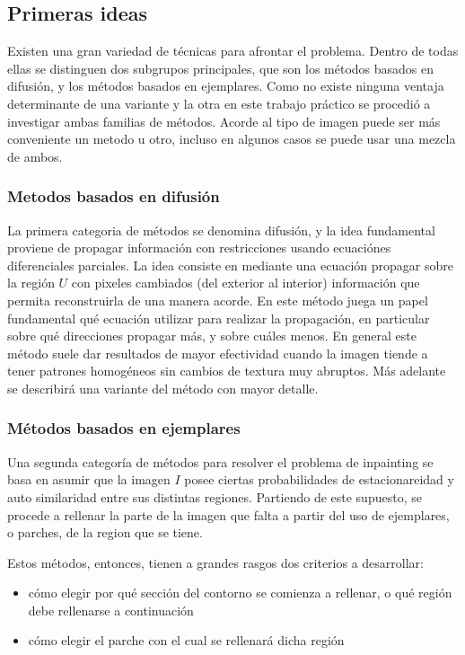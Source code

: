 \documentclass[assd_tpf_main.tex]{subfiles}
\begin{document}
\subsection{Primeras ideas}
Existen una gran variedad de técnicas para afrontar el problema. Dentro de todas ellas se distinguen dos subgrupos principales, que son los m\'etodos basados en difusión, y los métodos basados en ejemplares. Como no existe ninguna ventaja determinante de una variante y la otra en este trabajo práctico se procedió a investigar ambas familias de métodos. Acorde al tipo de imagen puede ser más conveniente un metodo u otro, incluso en algunos casos se puede usar una mezcla de ambos.

\subsubsection{Metodos basados en difusión}
La primera categoria de métodos se denomina difusión, y la idea fundamental proviene de propagar información con restricciones usando ecuaciónes diferenciales parciales. La idea consiste en mediante una ecuación propagar sobre la región $U$ con pixeles cambiados (del exterior al interior) información que permita reconstruirla de una manera acorde.
En este método juega un papel fundamental qu\'e ecuación utilizar para realizar la propagación, en particular sobre qu\'e direcciones propagar más, y sobre cu\'ales menos. En general este m\'etodo suele dar resultados de mayor efectividad cuando la imagen tiende a tener patrones homog\'eneos sin cambios de textura muy abruptos.  Más adelante se describirá una variante del método con mayor detalle.

\subsubsection{Métodos basados en ejemplares}

Una segunda categor\'ia de m\'etodos para resolver el problema de inpainting se basa en 
asumir que la imagen $I$ posee ciertas probabilidades de estacionareidad y auto similaridad 
entre sus distintas regiones. Partiendo de este supuesto, se procede a rellenar la parte
de la imagen que falta a partir del uso de ejemplares, o parches, de la region que se tiene.

Estos m\'etodos, entonces, tienen a grandes rasgos dos criterios a desarrollar:
\begin{itemize}
	\item c\'omo elegir por qu\'e secci\'on del contorno se comienza a rellenar, o qu\'e
	regi\'on debe rellenarse a continuaci\'on
	\item c\'omo elegir el parche con el cual se rellenar\'a dicha regi\'on
\end{itemize}
\end{document}
